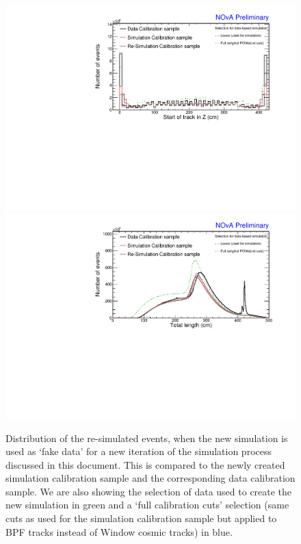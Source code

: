 \begin{figure}[!ht]
\includegraphics[width=\textwidth]{Plots/TBCalibration/DBSim_SimVersionComparison_StartZ.pdf}
\includegraphics[width=\textwidth]{Plots/TBCalibration/DBSim_SimVersionComparison_TotLength.pdf}
\caption[Comparison of simulation to a circular re-simulation validation sample]{Distribution of the re-simulated events, when the new simulation is used as `fake data' for a new iteration of the simulation process discussed in this document. This is compared to the newly created simulation calibration sample and the corresponding data calibration sample. We are also showing the selection of data used to create the new simulation in green and a `full calibration cuts' selection (same cuts as used for the simulation calibration sample but applied to \acrshort{BPF} tracks instead of Window cosmic tracks) in blue.}
\label{fig:DataBasedSimSimVersionComparison}
\end{figure}

